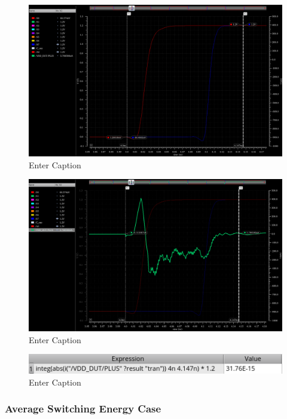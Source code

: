 \documentclass[12pt,letterpaper]{article}
\begin{document}
\begin{figure}[H]
    \centering
    \includegraphics[width=1\linewidth]{writeup//figures//baseline//active_energy/max_switching_energy_signals.png}
    \caption{Enter Caption}
\end{figure}

\begin{figure}[H]
    \centering
    \includegraphics[width=1\linewidth]{writeup//figures//baseline//active_energy/max_switching_energy_current.png}
    \caption{Enter Caption}
\end{figure}

\begin{figure}[H]
    \centering
    \includegraphics[width=0.5\linewidth]{writeup//figures//baseline//active_energy/max_switching_energy_value.png}
    \caption{Enter Caption}
\end{figure}

\subsubsection{Average Switching Energy Case}
\end{document}
